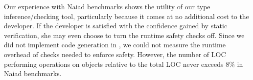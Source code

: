 Our experience with Naiad benchmarks shows the utility of our
type inference/checking tool,
particularly because it comes at no additional cost to the developer.
If the developer is satisfied with
the confidence gained by static verification, she may even choose to
turn the runtime safety checks off. Since we did not implement code
generation in \namec, we could not measure the runtime overhead of
checks needed to enforce safety. However, the number of LOC performing
operations on  objects relative to the total LOC never
exceeds 8\% in Naiad benchmarks. 


